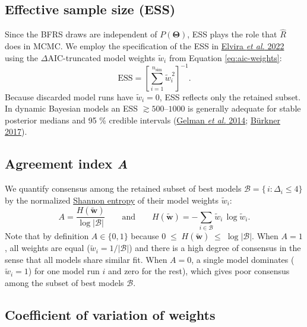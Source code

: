 \documentclass[
]{book}
\begin{document}
\subsection{Effective sample size (ESS)}\label{effective-sample-size-ess}

Since the BFRS draws are independent of \(P(\boldsymbol{\Theta})\), ESS plays
the role that \(\hat R\) does in MCMC. We employ the specification of the ESS in \href{https://onlinelibrary.wiley.com/doi/10.1111/insr.12500}{Elvira \emph{et al.} 2022} using the \(\Delta \text{AIC}\)-truncated model weights \(\tilde w_i\) from Equation \eqref{eq:aic-weights}:
\begin{equation}
\widehat{\text{ESS}} =
\left[
\sum_{i=1}^{n_{\text{sim}}} \tilde{w}_i^{\,2}
\right]^{-1}.
\label{eq:ess}
\end{equation}
Because discarded model runs have \(\tilde{w}_i=0\), ESS reflects only the retained
subset. In dynamic Bayesian models an ESS \(\gtrsim\!500\)--\(1000\) is generally
adequate for stable posterior medians and 95 \% credible intervals
(\href{https://sites.stat.columbia.edu/gelman/book/}{Gelman \emph{et al.} 2014};
\href{https://www.jstatsoft.org/article/view/v080i01}{Bürkner 2017}).

\subsection{\texorpdfstring{Agreement index \emph{A}}{Agreement index A}}\label{agreement-index-a}

We quantify consensus among the retained subset of best models \(\mathcal B = \{\,i : \Delta_i \le 4\}\) by the normalized \href{https://en.wikipedia.org/wiki/Entropy_(information_theory)}{Shannon entropy} of their model weights \(\tilde w_i\):
\begin{equation}
A = 
\frac{H(\mathbf{\tilde{w}})}{\log|\mathcal B|}
\qquad \text{and} \qquad
H(\mathbf{\tilde{w}})
=
-\sum_{i\in\mathcal B}\tilde w_i\,\log\tilde w_i.
\label{eq:agreement}
\end{equation}
Note that by definition \(A \in \{0,1\}\) because \(0 \;\le\; H(\mathbf{\tilde{w}})\;\le\;\log|\mathcal B|\). When \(A=1\), all weights are equal (\(\tilde w_i = 1/|\mathcal B|\)) and there is a high degree of consensus in the sense that all models share similar fit. When \(A=0\), a single model dominates (\(\tilde w_i = 1\)) for one model run \(i\) and zero for the rest), which gives poor consensus among the subset of best models \(\mathcal B\).

\subsection{Coefficient of variation of weights}\label{coefficient-of-variation-of-weights}
\end{document}
